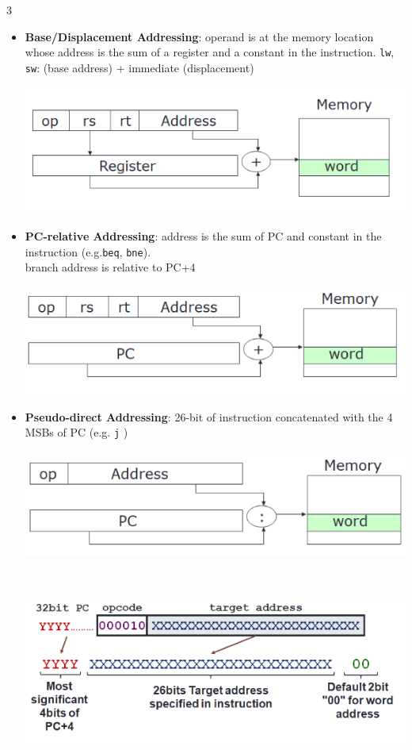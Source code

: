\documentclass[12pt, landscape]{article}
\newcommand{\code}[1]{\colorbox{gray!25!}{\lstinline[basicstyle=\scriptsize]|#1|}}
\begin{document}
\begin{multicols*}{3}
\begin{itemize}
\item \textbf{Base/Displacement Addressing}: operand is at the memory location whose address is the sum of a register and a constant in the instruction. 
\code{lw}, \code{sw}: (base address) + immediate (displacement) \\
\centerline{\includegraphics[width=0.9\linewidth]{baseaddressing}}

\item \textbf{PC-relative Addressing}: address is the sum of PC and constant in the instruction (e.g.\code{beq}, \code{bne}). \\ 
branch address is relative to PC+4 \\
\centerline{\includegraphics[width=0.9\linewidth]{pcrelativeaddressing}}

\item \textbf{Pseudo-direct Addressing}: 26-bit of instruction concatenated with the 4 MSBs of PC (e.g. \code{j} )
\centerline{\includegraphics[width=0.9\linewidth]{pseudodirectaddressing}} \\
\centerline{\includegraphics[width=0.7\linewidth]{pseudodirectaddressing2}}
\end{itemize}


\end{multicols*}
\end{document}
